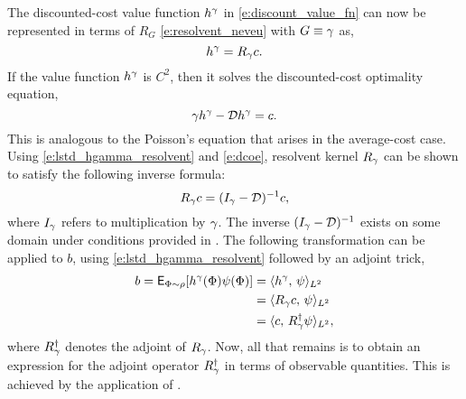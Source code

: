 The discounted-cost value function $h^\gamma$ in \eqref{e:discount_value_fn} can now be represented in terms of $R_G$ \eqref{e:resolvent_neveu} with $G \equiv \gamma$ as,
\begin{equation}
h^\discount = R_\discount c.
\label{e:lstd_hgamma_resolvent}
\end{equation}
If the value function $h^\gamma$ is $C^2$, then it solves the discounted-cost optimality equation,
\begin{equation}
\discount h^\discount - \generate h^\discount =  c.
\label{e:dcoe}
\end{equation}
This is analogous to the Poisson's equation that arises in the average-cost case. 
Using \eqref{e:lstd_hgamma_resolvent} and \eqref{e:dcoe}, resolvent kernel $R_\gamma$ can be shown to satisfy the following inverse formula:
\begin{equation}
R_\gamma c = ( I_\gamma - {\cal D})^{-1} c,
\end{equation}
where $I_\gamma$ refers to multiplication by $\gamma$. The inverse $(I_\gamma - {\cal D})^{-1}$ exists on some domain under conditions provided in \cite{devkonmey17a}.  
The following transformation can be applied to $b$, using \eqref{e:lstd_hgamma_resolvent} followed by an adjoint trick,
\begin{equation}
\begin{aligned}
b = \Expect_{\markovstate \sim \pr} [h^\discount(\markovstate) \basis(\markovstate) ] &= \langle h^\discount, \, \basis \rangle_{L^2}\\
& = \langle R_\discount c, \,\basis \rangle_{L^2} \\
& = \langle c,\, R^\dagger_\discount \basis \rangle_{L^2},
\label{e:lstd_b_R_adjoint}
\end{aligned}
\end{equation}
where $R^\dagger_\gamma$ denotes the adjoint of $R_\gamma$. Now, all that remains is to obtain an expression for the adjoint operator $R^\dagger_\gamma$ in terms of observable quantities. This is achieved by the application of .


